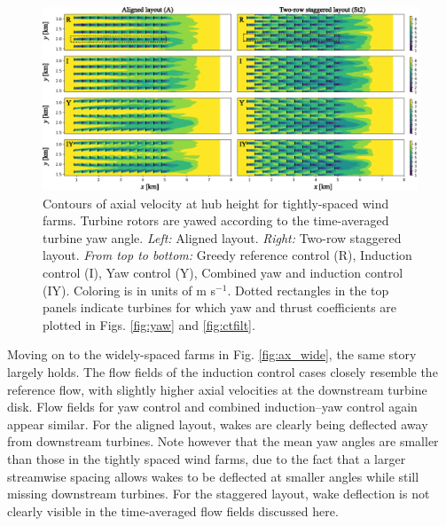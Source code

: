 \documentclass[a4paper]{jpconf}
\begin{document}
\begin{figure}[t]
	\includegraphics[width=\textwidth]{Torque18/tight_stat}
	\caption{Contours of axial velocity at hub height for tightly-spaced wind farms. Turbine rotors are yawed according to the time-averaged turbine yaw angle. \emph{Left: } Aligned layout. \emph{Right: } Two-row staggered layout. \emph{From top to bottom:} Greedy reference control (R), Induction control (I), Yaw control (Y), Combined yaw and induction control (IY). Coloring is in units of m s$^{-1}$. Dotted rectangles in the top panels indicate turbines for which yaw and thrust coefficients are plotted in Figs. \ref{fig:yaw} and \ref{fig:ctfilt}. \label{fig:ax_tight}}
\end{figure}

Moving on to the widely-spaced farms in Fig. \ref{fig:ax_wide}, the same story largely holds. The flow fields of the induction control cases closely resemble the reference flow, with slightly higher axial velocities at the downstream turbine disk. Flow fields for yaw control and combined induction--yaw control again appear similar.  For the aligned layout, wakes are clearly being deflected away from downstream turbines. Note however that the mean yaw angles are smaller than those in the tightly spaced wind farms, due to the fact that a larger streamwise spacing allows wakes to be deflected at smaller angles while still missing downstream turbines. For the staggered layout, wake deflection is not clearly visible in the time-averaged flow fields discussed here. 
\end{document}
